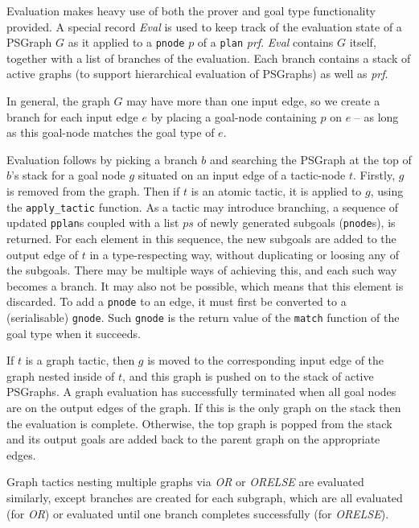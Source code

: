 \documentclass[submission,copyright,creativecommons]{eptcs}
\begin{document}
Evaluation makes heavy use of both the prover and goal type functionality provided. A special record \textit{Eval} is used to keep track of the evaluation state of a PSGraph $G$ as it applied to a \texttt{pnode} $p$ of a \texttt{plan} \textit{prf}. \textit{Eval} contains $G$ itself, together with a list of branches of the evaluation. Each branch contains a stack of active graphs (to support hierarchical evaluation of PSGraphs) as well as \textit{prf}.

In general, the graph $G$ may have more than one input edge, so we create a branch for each input edge $e$ by placing a goal-node containing $p$ on $e$ -- as long as this goal-node matches the goal type of $e$.


Evaluation follows by picking a branch $b$ and searching the PSGraph at the top of $b$'s stack for a goal node $g$ situated on an input edge of a tactic-node $t$. Firstly, $g$ is removed from the graph. Then if $t$ is an atomic tactic,  it is applied to $g$, using the \texttt{apply\_tactic} function. 
As a tactic may introduce branching, a sequence of updated \texttt{pplan}s coupled with a list $ps$ of newly generated subgoals (\texttt{pnode}s), is returned.  For each element in this sequence, the new subgoals are added to the output edge of $t$ in a type-respecting way, without duplicating or loosing any of the subgoals. There may be multiple ways of achieving this, and each such way becomes a branch. It may also not be possible, which 
means that this element is discarded. To add a \texttt{pnode} to an edge, it must first be converted to a (serialisable) \texttt{gnode}. Such \texttt{gnode} is the return value of the \texttt{match} function of the goal type when it succeeds.

If $t$ is a graph tactic, then $g$ is moved to the corresponding input edge of the graph nested inside of $t$, and this graph is pushed on to the stack of active PSGraphs. A graph evaluation has successfully terminated when all goal nodes are on the output edges of the graph. If this is the only graph on the stack then the evaluation is complete. Otherwise, the top graph is popped from the stack and its output goals are added back to the parent graph on the appropriate edges.

Graph tactics nesting multiple graphs via \textit{OR} or \textit{ORELSE} are evaluated similarly, except branches are created for each subgraph, which are all evaluated (for \textit{OR}) or evaluated until one branch completes successfully (for \textit{ORELSE}).
\end{document}
